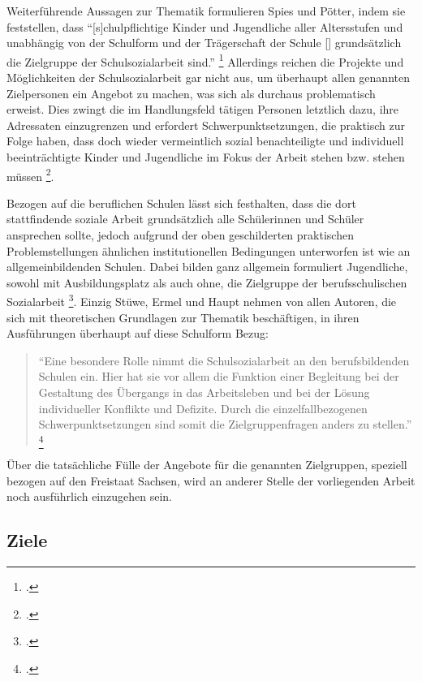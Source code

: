 \noindent
Weiterführende Aussagen zur Thematik formulieren Spies und Pötter, indem sie feststellen, dass "`[s]chulpflichtige Kinder und Jugendliche aller Altersstufen und unabhängig von der Schulform und der Trägerschaft der Schule [\punkte] grundsätzlich die Zielgruppe der Schulsozialarbeit sind."' \footcite[46]{Spies2011} Allerdings reichen die Projekte und Möglichkeiten der Schulsozialarbeit gar nicht aus, um überhaupt allen genannten Zielpersonen ein Angebot zu machen, was sich als durchaus problematisch erweist. Dies zwingt die im Handlungsfeld tätigen Personen letztlich dazu, ihre Adressaten einzugrenzen und erfordert Schwerpunktsetzungen, die praktisch zur Folge haben, dass doch wieder vermeintlich sozial benachteiligte und individuell beeinträchtigte Kinder und Jugendliche im Fokus der Arbeit stehen bzw. stehen müssen \footcite[vgl.][47]{Spies2011}.
 
Bezogen auf die beruflichen Schulen lässt sich festhalten, dass die dort stattfindende soziale Arbeit grundsätzlich alle Schülerinnen und Schüler ansprechen sollte, jedoch aufgrund der oben geschilderten praktischen Problemstellungen ähnlichen institutionellen Bedingungen unterworfen ist wie an allgemeinbildenden Schulen. Dabei  bilden ganz allgemein formuliert Jugendliche, sowohl mit Ausbildungsplatz als auch ohne, die Zielgruppe der berufsschulischen Sozialarbeit \footcite[vgl.][5]{ASSB2011}. Einzig Stüwe, Ermel und Haupt nehmen von allen Autoren, die sich mit theoretischen Grundlagen zur Thematik beschäftigen, in ihren Ausführungen überhaupt auf diese Schulform Bezug:

\begin{quotation}
\noindent
"`Eine besondere Rolle nimmt die Schulsozialarbeit an den berufsbildenden Schulen ein. Hier hat sie vor allem die Funktion einer Begleitung bei der Gestaltung des Übergangs in das Arbeitsleben und bei der Lösung individueller Konflikte und Defizite. Durch die einzelfallbezogenen Schwerpunktsetzungen sind somit die Zielgruppenfragen anders zu stellen."' \footcite[74]{Stuewe2015}
\end{quotation}

\noindent
Über die tatsächliche Fülle der Angebote für die genannten Zielgruppen, speziell bezogen auf den Freistaat Sachsen, wird an anderer Stelle der vorliegenden Arbeit noch ausführlich einzugehen sein.  

\subsection{Ziele}
\label{sec:Ziele}

